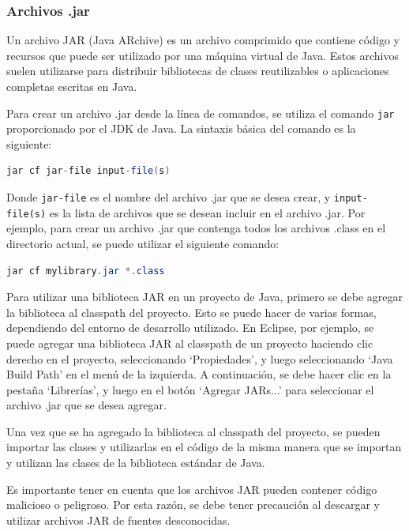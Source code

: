 \documentclass[executivepaper]{article}
\begin{document}
\subsubsection*{Archivos .jar}

Un archivo JAR (Java ARchive) es un archivo comprimido que contiene código y recursos que puede ser utilizado por una máquina virtual de Java. Estos archivos suelen utilizarse para distribuir bibliotecas de clases reutilizables o aplicaciones completas escritas en Java.

Para crear un archivo .jar desde la línea de comandos, se utiliza el comando \texttt{jar} proporcionado por el JDK de Java. La sintaxis básica del comando es la siguiente:

\begin{lstlisting}[language=Java]
jar cf jar-file input-file(s)
\end{lstlisting}

Donde \texttt{jar-file} es el nombre del archivo .jar que se desea crear, y \texttt{input-file(s)} es la lista de archivos que se desean incluir en el archivo .jar. Por ejemplo, para crear un archivo .jar que contenga todos los archivos .class en el directorio actual, se puede utilizar el siguiente comando:

\begin{lstlisting}[language=Java]
jar cf mylibrary.jar *.class
\end{lstlisting}

Para utilizar una biblioteca JAR en un proyecto de Java, primero se debe agregar la biblioteca al classpath del proyecto. Esto se puede hacer de varias formas, dependiendo del entorno de desarrollo utilizado. En Eclipse, por ejemplo, se puede agregar una biblioteca JAR al classpath de un proyecto haciendo clic derecho en el proyecto, seleccionando \enquote*{Propiedades}, y luego seleccionando \enquote*{Java Build Path} en el menú de la izquierda. A continuación, se debe hacer clic en la pestaña \enquote*{Librerías}, y luego en el botón \enquote*{Agregar JARs...} para seleccionar el archivo .jar que se desea agregar.

Una vez que se ha agregado la biblioteca al classpath del proyecto, se pueden importar las clases y utilizarlas en el código de la misma manera que se importan y utilizan las clases de la biblioteca estándar de Java.

Es importante tener en cuenta que los archivos JAR pueden contener código malicioso o peligroso. Por esta razón, se debe tener precaución al descargar y utilizar archivos JAR de fuentes desconocidas.
\end{document}
